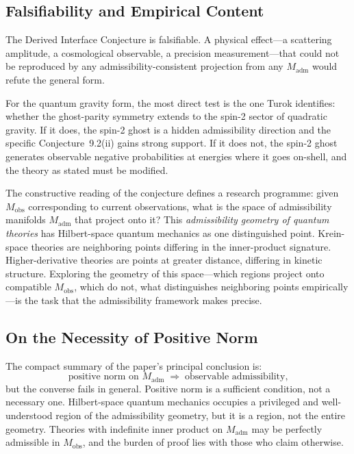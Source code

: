 \documentclass[12pt,a4paper]{article}
\theoremstyle{remark}
\begin{document}
\subsection{Falsifiability and Empirical Content}

The Derived Interface Conjecture is falsifiable. A physical
effect---a scattering amplitude, a cosmological observable, a precision
measurement---that could not be reproduced by any admissibility-consistent
projection from any $M_{\mathrm{adm}}$ would refute the general form.

For the quantum gravity form, the most direct test is the one Turok
identifies: whether the ghost-parity symmetry extends to the spin-2 sector
of quadratic gravity. If it does, the spin-2 ghost is a hidden admissibility
direction and the specific Conjecture~9.2(ii) gains strong support. If
it does not, the spin-2 ghost generates observable negative probabilities
at energies where it goes on-shell, and the theory as stated must be
modified.

The constructive reading of the conjecture defines a research programme:
given $M_{\mathrm{obs}}$ corresponding to current observations, what is
the space of admissibility manifolds $M_{\mathrm{adm}}$ that project onto
it? This \emph{admissibility geometry of quantum theories} has Hilbert-space
quantum mechanics as one distinguished point. Krein-space theories are
neighboring points differing in the inner-product signature. Higher-derivative
theories are points at greater distance, differing in kinetic structure.
Exploring the geometry of this space---which regions project onto compatible
$M_{\mathrm{obs}}$, which do not, what distinguishes neighboring points
empirically---is the task that the admissibility framework makes precise.

\subsection{On the Necessity of Positive Norm}

The compact summary of the paper's principal conclusion is:
\begin{equation}
  \text{positive norm on } M_{\mathrm{adm}}
  \;\Longrightarrow\;
  \text{observable admissibility,}
\end{equation}
but the converse fails in general. Positive norm is a sufficient condition,
not a necessary one. Hilbert-space quantum mechanics occupies a privileged
and well-understood region of the admissibility geometry, but it is a
region, not the entire geometry. Theories with indefinite inner product on
$M_{\mathrm{adm}}$ may be perfectly admissible in $M_{\mathrm{obs}}$, and
the burden of proof lies with those who claim otherwise.
\end{document}
